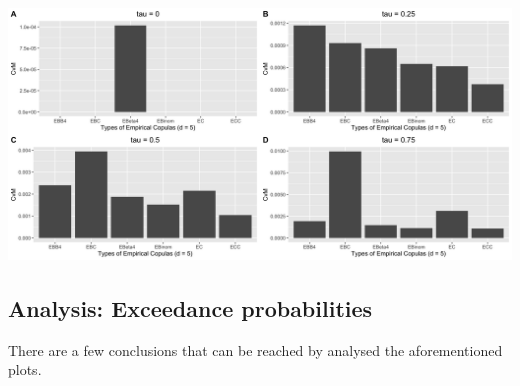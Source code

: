 \documentclass[12pt]{report}
\newcommand{\1}{\mathbf{1}}
\begin{document}
\begin{flushleft}
\begin{center}
\label{G_5d_s_CvM}
\includegraphics[width=17cm]{ExceedanceCvM/G_5d_s_CvM.png}
\end{center}%

\newpage
\subsection{Analysis: Exceedance probabilities}
\vspace{0.5cm}
There are a few conclusions that can be reached by analysed the aforementioned plots. \\


\end{flushleft}
\end{document}
